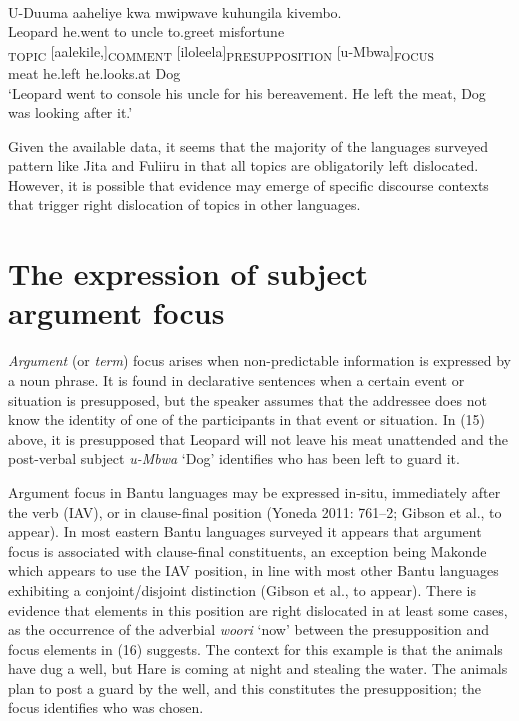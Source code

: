 \documentclass[output=paper]{langsci/langscibook}
\begin{document}
\ea\label{ex:}
\\
\gll U-Duuma aaheliye kwa mwipwave kuhungila kivembo.\\
Leopard he.went to uncle to.greet misfortune\\


\gll [Inyama]\textsubscript{TOPIC} [aalekile,]\textsubscript{COMMENT} [iloleela]\textsubscript{PRESUPPOSITION} [u-Mbwa]\textsubscript{FOCUS}\\
meat he.left he.looks.at Dog\\


\glt \textup{‘Leopard went to console his uncle for his bereavement. He left}\textup{ the meat, Dog was looking after it}\textup{.’}
\z

Given the available data, it seems that the majority of the languages surveyed pattern like Jita and Fuliiru in that all topics are obligatorily left dislocated. However, it is possible that evidence may emerge of specific discourse contexts that trigger right dislocation of topics in other languages.

\section{The expression of subject argument focus}

\textit{Argument} (or \textit{term}) focus arises when non-predictable information is expressed by a noun phrase. It is found in declarative sentences when a certain event or situation is presupposed, but the speaker assumes that the addressee does not know the identity of one of the participants in that event or situation. In (15) above, it is presupposed that Leopard will not leave his meat unattended and the post-verbal subject \textit{u}\textit{\nobreakdash-Mbwa} ‘Dog’ identifies who has been left to guard it.

Argument focus in Bantu languages may be expressed in-situ, immediately after the verb (IAV), or in clause-final position (Yoneda 2011: 761–2; Gibson et al., to appear). In most eastern Bantu languages surveyed it appears that argument focus is associated with clause-final constituents, an exception being Makonde which appears to use the IAV position, in line with most other Bantu languages exhibiting a conjoint/disjoint distinction (Gibson et al., to appear). There is evidence that elements in this position are right dislocated in at least some cases, as the occurrence of the adverbial \textit{woori} ‘now’ between the presupposition and focus elements in (16) suggests. The context for this example is that the animals have dug a well, but Hare is coming at night and stealing the water. The animals plan to post a guard by the well, and this constitutes the presupposition; the focus identifies who was chosen.
\end{document}
